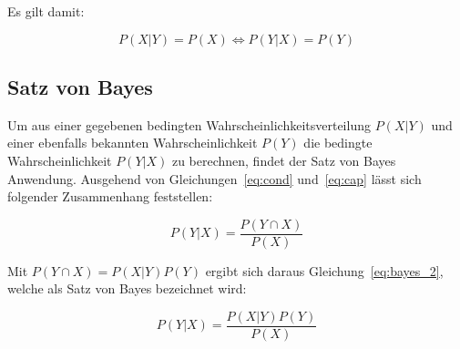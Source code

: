         Es gilt damit:

        \begin{equation}
            P(X|Y) = P(X) \Leftrightarrow P(Y|X) = P(Y)
            \label{eq:independence}
        \end{equation}

    \subsection{Satz von Bayes}
        Um aus einer gegebenen bedingten Wahrscheinlichkeitsverteilung $P(X|Y)$ und einer ebenfalls bekannten Wahrscheinlichkeit $P(Y)$ die bedingte Wahrscheinlichkeit $P(Y|X)$ zu berechnen, findet der Satz von Bayes Anwendung. 
        Ausgehend von Gleichungen~\ref{eq:cond} und~\ref{eq:cap} lässt sich folgender Zusammenhang feststellen:

        \begin{equation}
            P(Y|X) = \frac{P(Y \cap X)}{P(X)}
            \label{eq:bayes_1}
        \end{equation}

        Mit $P(Y \cap X) = P(X|Y)P(Y)$ ergibt sich daraus Gleichung~\ref{eq:bayes_2}, welche als Satz von Bayes bezeichnet wird:

        \begin{equation}
            P(Y|X) = \frac{P(X|Y)P(Y)}{P(X)}
            \label{eq:bayes_2}
        \end{equation}
